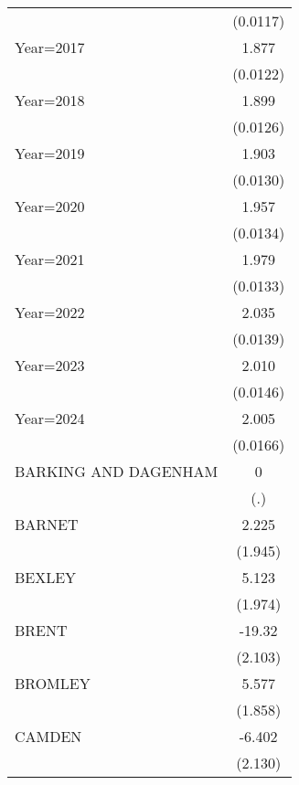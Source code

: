 {\begin{longtable}{l*{1}{c}}
                    &    (0.0117)         \\
\addlinespace
Year=2017           &       1.877\sym{***}\\
                    &    (0.0122)         \\
\addlinespace
Year=2018           &       1.899\sym{***}\\
                    &    (0.0126)         \\
\addlinespace
Year=2019           &       1.903\sym{***}\\
                    &    (0.0130)         \\
\addlinespace
Year=2020           &       1.957\sym{***}\\
                    &    (0.0134)         \\
\addlinespace
Year=2021           &       1.979\sym{***}\\
                    &    (0.0133)         \\
\addlinespace
Year=2022           &       2.035\sym{***}\\
                    &    (0.0139)         \\
\addlinespace
Year=2023           &       2.010\sym{***}\\
                    &    (0.0146)         \\
\addlinespace
Year=2024           &       2.005\sym{***}\\
                    &    (0.0166)         \\
\addlinespace
BARKING AND DAGENHAM&           0         \\
                    &         (.)         \\
\addlinespace
BARNET              &       2.225         \\
                    &     (1.945)         \\
\addlinespace
BEXLEY              &       5.123\sym{**} \\
                    &     (1.974)         \\
\addlinespace
BRENT               &      -19.32\sym{***}\\
                    &     (2.103)         \\
\addlinespace
BROMLEY             &       5.577\sym{**} \\
                    &     (1.858)         \\
\addlinespace
CAMDEN              &      -6.402\sym{**} \\
                    &     (2.130)         \\

\end{longtable}}
